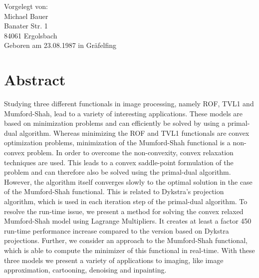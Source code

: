 \documentclass{scrreprt}
\begin{document}
\begin{titlepage}
\begin{center}
    \begin{flushleft}
        \begin{large}
            Vorgelegt von:\\
            Michael Bauer\\
            Banater Str. 1\\
            84061 Ergolsbach\\
            Geboren am 23.08.1987 in Gr\"afelfing
        \end{large}
    \end{flushleft}

    \end{center}

\end{titlepage}

\newpage

\chapter*{Abstract} %
\label{cha:abstract}

    Studying three different functionals in image processing, namely ROF, TVL1 and Mumford-Shah, lead to a variety of interesting applications. These models are based on minimization problems and can efficiently be solved by using a primal-dual algorithm. Whereas minimizing the ROF and TVL1 functionals are convex optimization problems, minimization of the Mumford-Shah functional is a non-convex problem. In order to overcome the non-convexity, convex relaxation techniques are used. This leads to a convex saddle-point formulation of the problem and can therefore also be solved using the primal-dual algorithm. However, the algorithm itself converges slowly to the optimal solution in the case of the Mumford-Shah functional. This is related to Dykstra's projection algorithm, which is used in each iteration step of the primal-dual algorithm. To resolve the run-time issue, we present a method for solving the convex relaxed Mumford-Shah model using Lagrange Multipliers. It creates at least a factor 450 run-time performance increase compared to the version based on Dykstra projections. Further, we consider an approach to the Mumford-Shah functional, which is able to compute the minimizer of this functional in real-time. With these three models we present a variety of applications to imaging, like image approximation, cartooning, denoising and inpainting.
    
\end{document}
